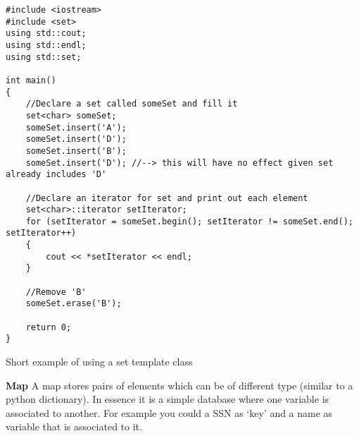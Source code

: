 \begin{listing}[H]
\begin{verbatim}
#include <iostream>
#include <set>
using std::cout;
using std::endl;
using std::set;

int main()
{
	//Declare a set called someSet and fill it
	set<char> someSet;
	someSet.insert('A');
	someSet.insert('D');
	someSet.insert('B');
	someSet.insert('D'); //--> this will have no effect given set already includes 'D'
	
	//Declare an iterator for set and print out each element
	set<char>::iterator setIterator;
	for (setIterator = someSet.begin(); setIterator != someSet.end(); setIterator++)
	{
		cout << *setIterator << endl;
	}
	
	//Remove 'B'
	someSet.erase('B');
	
	return 0;
}
\end{verbatim}
\caption{Short example of using a set template class}
\label{source_code_1}
\end{listing}


\noindent
\textbf{Map}
A map stores pairs of elements which can be of different type (similar to a python dictionary).
In essence it is a simple database where one variable is associated to another. For example you
could a SSN as `key' and a name as variable that is associated to it.

